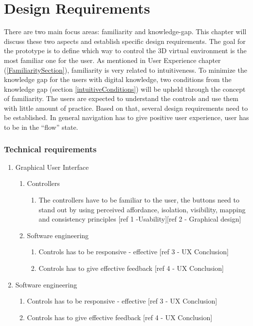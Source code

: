 \section{Design Requirements}
There are two main focus areas: familiarity and knowledge-gap. This chapter will discuss these two aspects and establish specific design requirements. 
The goal for the prototype is to define which way to control the 3D virtual environment is the most familiar one for the user. As mentioned in User Experience chapter (\ref{FamiliaritySection}), familiarity is very related to intuitiveness.
To minimize the knowledge gap for the users with digital knowledge, two conditions from the knowledge gap (section \ref{intuitiveConditions}) will be upheld through the concept of familiarity. The users are expected to understand the controls and use them with little amount of practice. Based on that, several design requirements need to be established. In general navigation has to give  positive user experience, user has to be in the “flow” state. 

\subsubsection{Technical requirements}
\begin{enumerate}
	\item Graphical User Interface
		\begin{enumerate}
		\item Controllers
			\begin{enumerate}
				\item The controllers have to be familiar to the user, 						the buttons need to stand out by using perceived 							affordance, isolation, visibility, mapping and 								consistency principles [ref 1 -Usability][ref 2 - 							Graphical design]
			\end{enumerate}
		\item Software engineering
			\begin{enumerate}
				\item Controls has to be responsive - effective [ref 3 - 					UX Conclusion]
				\item Controls has to give effective feedback [ref 4 - UX 					Conclusion]
			\end{enumerate}
		\end{enumerate}
	\item Software engineering
		\begin{enumerate}
			\item Controls has to be responsive - effective [ref 3 - UX 				Conclusion]
			\item Controls has to give effective feedback [ref 4 - UX 					Conclusion]
		\end{enumerate}	
\end{enumerate}
